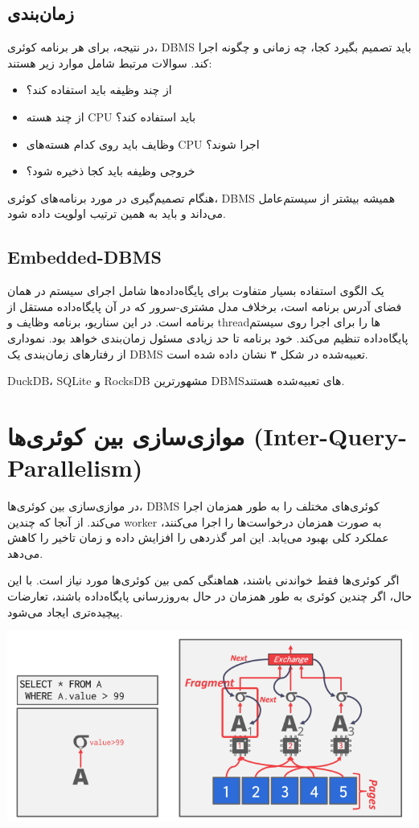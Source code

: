 \subsection{زمان‌بندی}
در نتیجه، برای هر برنامه کوئری، DBMS باید تصمیم بگیرد کجا، چه زمانی و چگونه اجرا کند. سوالات مرتبط شامل موارد زیر هستند:
\begin{itemize}
	\item از چند وظیفه باید استفاده کند؟
	\item از چند هسته CPU باید استفاده کند؟
	\item وظایف باید روی کدام هسته‌های CPU اجرا شوند؟
	\item خروجی وظیفه باید کجا ذخیره شود؟
\end{itemize}
هنگام تصمیم‌گیری در مورد برنامه‌های کوئری، DBMS همیشه بیشتر از سیستم‌عامل می‌داند و باید به همین ترتیب اولویت داده شود.

\subsection{Embedded-DBMS}
یک الگوی استفاده بسیار متفاوت برای پایگاه‌داده‌ها شامل اجرای سیستم در همان فضای آدرس برنامه است، برخلاف مدل مشتری-سرور که در آن پایگاه‌داده مستقل از برنامه است. در این سناریو، برنامه وظایف و threadها را برای اجرا روی سیستم پایگاه‌داده تنظیم می‌کند. خود برنامه تا حد زیادی مسئول زمان‌بندی خواهد بود. نموداری از رفتارهای زمان‌بندی یک DBMS تعبیه‌شده در شکل ۳ نشان داده شده است.

DuckDB، SQLite و RocksDB مشهورترین DBMSهای تعبیه‌شده هستند.

\pagebreak

\section{موازی‌سازی بین کوئری‌ها (Inter-Query-Parallelism)}
در موازی‌سازی بین کوئری‌ها، DBMS کوئری‌های مختلف را به طور همزمان اجرا می‌کند. از آنجا که چندین worker به صورت همزمان درخواست‌ها را اجرا می‌کنند، عملکرد کلی بهبود می‌یابد. این امر گذردهی را افزایش داده و زمان تاخیر را کاهش می‌دهد.

اگر کوئری‌ها فقط خواندنی باشند، هماهنگی کمی بین کوئری‌ها مورد نیاز است. با این حال، اگر چندین کوئری به طور همزمان در حال به‌روزرسانی پایگاه‌داده باشند، تعارضات پیچیده‌تری ایجاد می‌شود.

\qquad\qquad\qquad	\includegraphics[width=0.7\linewidth]{screenshot013}

